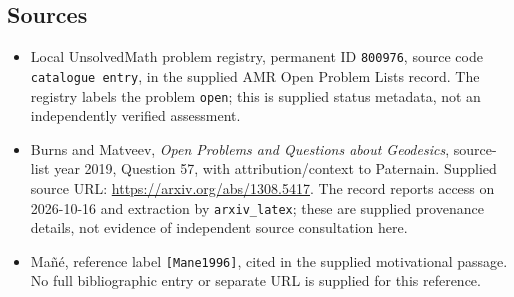 \documentclass[11pt]{article}
\begin{document}
\subsection{Sources}
\begin{itemize}
\item Local UnsolvedMath problem registry, permanent ID \texttt{800976}, source code \texttt{catalogue entry}, in the supplied AMR Open Problem Lists record. The registry labels the problem \texttt{open}; this is supplied status metadata, not an independently verified assessment.
\item Burns and Matveev, \emph{Open Problems and Questions about Geodesics}, source-list year 2019, Question 57, with attribution/context to Paternain. Supplied source URL: \url{https://arxiv.org/abs/1308.5417}. The record reports access on 2026-10-16 and extraction by \texttt{arxiv\_latex}; these are supplied provenance details, not evidence of independent source consultation here.
\item Ma\~n\'e, reference label \texttt{[Mane1996]}, cited in the supplied motivational passage. No full bibliographic entry or separate URL is supplied for this reference.
\end{itemize}
\end{document}
